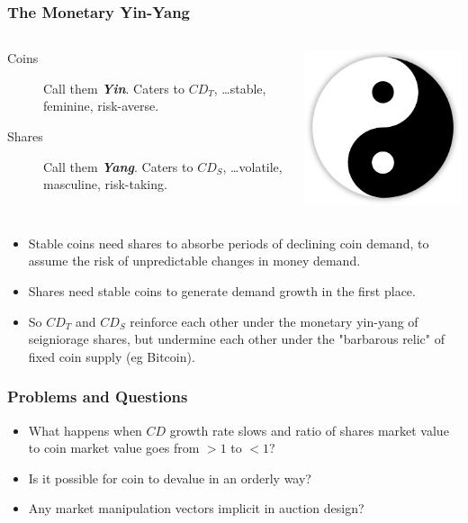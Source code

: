 \documentclass{beamer}
\begin{document}
\begin{frame}
  \frametitle{The Monetary Yin-Yang}

  \begin{columns}

    \begin{description}
    \item[Coins] Call them \textbf{\emph{Yin}}. Caters to $CD_{T}$,
      \dots stable, feminine, risk-averse.
    \item[Shares] Call them \textbf{\emph{Yang}}. Caters to $CD_{S}$,
      \dots volatile, masculine, risk-taking.
    \end{description}

    \begin{center}
      \includegraphics[scale=0.3]{yinyang.png}  
    \end{center}
  \end{columns}

  \begin{itemize}
  \item Stable coins need shares to absorbe periods of declining coin
    demand, to assume the risk of unpredictable changes in money
    demand.
  \item Shares need stable coins to generate demand growth in the
    first place.
  \item So $CD_{T}$ and $CD_{S}$ reinforce each other under the
    monetary yin-yang of seigniorage shares, but undermine each other
    under the "barbarous relic" of fixed coin supply (eg Bitcoin).
  \end{itemize}

\end{frame}

\begin{frame}
  \frametitle{Problems and Questions}
  
  \begin{itemize}
  \item What happens when $CD$ growth rate slows and ratio of shares
    market value to coin market value goes from $>1$ to $<1$?
  \item Is it possible for coin to devalue in an orderly way?
  \item Any market manipulation vectors implicit in auction design?
  \end{itemize}

\end{frame}
\end{document}
